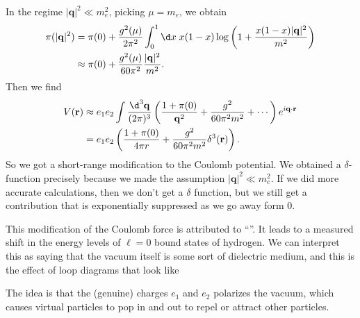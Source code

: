 \documentclass[a4paper]{article}
\begin{document}
In the regime $|\mathbf{q}|^2 \ll m_e^2$, picking $\mu = m_e$, we obtain
\begin{align*}
  \pi(|\mathbf{q}|^2) &= \pi(0) + \frac{g^2(\mu)}{2\pi^2} \int_0^1 \d x\; x(1 - x) \log \left(1 + \frac{x(1 - x)|\mathbf{q}|^2}{m^2}\right)\\
  &\approx \pi(0) + \frac{g^2(\mu)}{60\pi^2} \frac{|\mathbf{q}|^2}{m^2}.
\end{align*}
Then we find
\begin{align*}
  V(\mathbf{r}) &\approx e_1 e_2 \int \frac{\d^3 \mathbf{q}}{(2\pi)^3} \left(\frac{1 + \pi(0)}{\mathbf{q}^2} + \frac{g^2}{60 \pi^2 m^2} + \cdots\right) e^{i\mathbf{q}\cdot \mathbf{r}}\\
  &= e_1 e_2\left(\frac{ 1 + \pi(0)}{4\pi r} + \frac{g^2}{60 \pi^2 m^2} \delta^3(\mathbf{r})\right).
\end{align*}
So we got a short-range modification to the Coulomb potential. We obtained a $\delta$-function precisely because we made the assumption $|\mathbf{q}|^2 \ll m_e^2$. If we did more accurate calculations, then we don't get a $\delta$ function, but we still get a contribution that is exponentially suppressed as we go away form $0$.

This modification of the Coulomb force is attributed to ``''. It leads to a measured shift in the energy levels of $\ell = 0$ bound states of hydrogen. We can interpret this as saying that the vacuum itself is some sort of dielectric medium, and this is the effect of loop diagrams that look like
\begin{center}
\end{center}
The idea is that the (genuine) charges $e_1$ and $e_2$ polarizes the vacuum, which causes virtual particles to pop in and out to repel or attract other particles.
\end{document}
